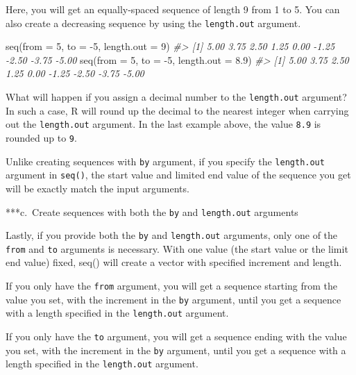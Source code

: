 \documentclass[
]{book}
\newenvironment{Shaded}{\begin{snugshade}}{\end{snugshade}}
\newcommand{\AttributeTok}[1]{\textcolor[rgb]{0.77,0.63,0.00}{#1}}
\newcommand{\CommentTok}[1]{\textcolor[rgb]{0.56,0.35,0.01}{\textit{#1}}}
\newcommand{\DecValTok}[1]{\textcolor[rgb]{0.00,0.00,0.81}{#1}}
\newcommand{\FloatTok}[1]{\textcolor[rgb]{0.00,0.00,0.81}{#1}}
\newcommand{\FunctionTok}[1]{\textcolor[rgb]{0.00,0.00,0.00}{#1}}
\newcommand{\NormalTok}[1]{#1}
\newcommand{\SpecialCharTok}[1]{\textcolor[rgb]{0.00,0.00,0.00}{#1}}
\newenvironment{blackbox}{
  \definecolor{shadecolor}{rgb}{0, 0, 0}  %
  \color{white}
  \begin{shaded}}
 {\end{shaded}}
\newenvironment{infobox}[1]
  {
  \begin{itemize}
  \renewcommand{\labelitemi}{
    \raisebox{-.7\height}[0pt][0pt]{
      {\setkeys{Gin}{width=3em,keepaspectratio}
        \texttt{[image: pics/\#1]}}
    }
  }
  \setlength{\fboxsep}{1em}
  \begin{blackbox}
  \item
  }
  {
  \end{blackbox}
  \end{itemize}
  }
\begin{document}
Here, you will get an equally-spaced sequence of length 9 from 1 to 5. You can also create a decreasing sequence by using the \texttt{length.out} argument.

\begin{Shaded}
\begin{Highlighting}[]
\FunctionTok{seq}\NormalTok{(}\AttributeTok{from =} \DecValTok{5}\NormalTok{, }\AttributeTok{to =} \SpecialCharTok{{-}}\DecValTok{5}\NormalTok{, }\AttributeTok{length.out =} \DecValTok{9}\NormalTok{) }
\CommentTok{\#\textgreater{} [1]  5.00  3.75  2.50  1.25  0.00 {-}1.25 {-}2.50 {-}3.75 {-}5.00}
\FunctionTok{seq}\NormalTok{(}\AttributeTok{from =} \DecValTok{5}\NormalTok{, }\AttributeTok{to =} \SpecialCharTok{{-}}\DecValTok{5}\NormalTok{, }\AttributeTok{length.out =} \FloatTok{8.9}\NormalTok{) }
\CommentTok{\#\textgreater{} [1]  5.00  3.75  2.50  1.25  0.00 {-}1.25 {-}2.50 {-}3.75 {-}5.00}
\end{Highlighting}
\end{Shaded}

What will happen if you assign a decimal number to the \texttt{length.out} argument? In such a case, R will round up the decimal to the nearest integer when carrying out the \texttt{length.out} argument. In the last example above, the value \texttt{8.9} is rounded up to \texttt{9}.

\begin{infobox}{caution}
Unlike creating sequences with \texttt{by} argument, if you specify the \texttt{length.out} argument in \texttt{seq()}, the start value and limited end value of the sequence you get will be exactly match the input arguments.

\end{infobox}

***c.~Create sequences with both the \texttt{by} and \texttt{length.out} arguments

Lastly, if you provide both the \texttt{by} and \texttt{length.out} arguments, only one of the \texttt{from} and \texttt{to} arguments is necessary. With one value (the start value or the limit end value) fixed, seq() will create a vector with specified increment and length.

If you only have the \texttt{from} argument, you will get a sequence starting from the value you set, with the increment in the \texttt{by} argument, until you get a sequence with a length specified in the \texttt{length.out} argument.

If you only have the \texttt{to} argument, you will get a sequence ending with the value you set, with the increment in the \texttt{by} argument, until you get a sequence with a length specified in the \texttt{length.out} argument.
\end{document}
